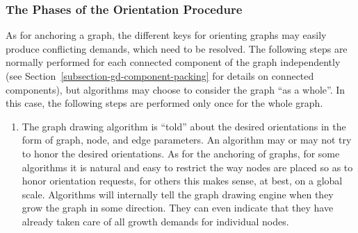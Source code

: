 \subsubsection{The Phases of the Orientation Procedure}
\label{subsection-graph-orientation-phases}

As for anchoring a graph, the different keys for orienting graphs may
easily produce conflicting demands, which need to be
resolved. The following steps are normally performed for each
connected component of the graph independently (see 
Section~\ref{subsection-gd-component-packing} for details on connected components),
but algorithms may choose to consider the graph ``as a whole''. In
this case, the following steps are performed only once for the whole
graph. 

\begin{enumerate}
\item
  The graph drawing algorithm is ``told'' about the desired
  orientations in the form of graph, node, and edge parameters. 
  An algorithm may or may not try to honor the desired
  orientations. As for the anchoring of graphs, for some algorithms it
  is natural and easy to restrict the way nodes are placed so as to
  honor orientation requests, for others this makes sense, at best, on
  a global scale. Algorithms will internally tell the graph drawing
  engine when they grow the graph in some direction. They can even
  indicate that they have already taken care of all growth demands for
  individual nodes.


\end{enumerate}
